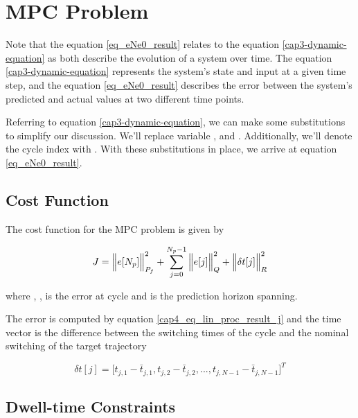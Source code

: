 \section{MPC Problem}

Note that the equation \eqref{eq_eNe0_result} relates to the equation \eqref{cap3-dynamic-equation} as both describe the evolution of a
system over time. The equation \eqref{cap3-dynamic-equation} represents the system's state and input at a given time step,
and the equation \eqref{eq_eNe0_result} describes the error between the system's predicted and actual values at two different time points.

Referring to equation \eqref{cap3-dynamic-equation}, we can make some substitutions to simplify our discussion.
We'll replace variable , and . Additionally, we'll denote the cycle index with .
With these substitutions in place, we arrive at equation \eqref{eq_eNe0_result}.

\subsection{Cost Function}

The cost function for the MPC problem is given by

\begin{equation}
\label{eq_cost_funcion}
    J = \Big\Vert e[N_p] \Big\Vert^2_{P_f} \\
    + \sum^{N_p - 1}_{j=0}\Big\Vert e[j] \Big\Vert^2_{Q} + \Big\Vert \delta t[j] \Big\Vert^2_{R}
\end{equation}

\noindent
where , ,  is the 
error at cycle  and  is the prediction horizon spanning.


The error  is computed by equation \eqref{cap4_eq_lin_proc_result_j} and the time vector
 is the difference between the switching times of the cycle and the nominal switching of the target trajectory  

\noindent
\begin{equation}
    \delta t[j] = \Big[t_{j,1} - \bar{t}_{j,1}, t_{j,2} - \bar{t}_{j,2}, ..., t_{j,N-1} - \bar{t}_{j,N-1}\Big]^T
\end{equation}

\subsection{Dwell-time Constraints}

